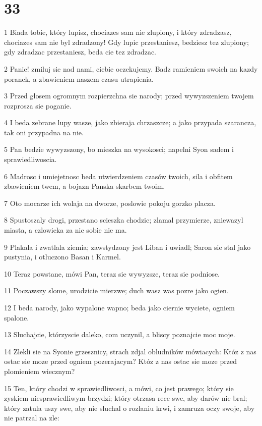 \chapter{33}

\par 1 Biada tobie, który lupisz, chociazes sam nie zlupiony, i który zdradzasz, chociazes sam nie byl zdradzony! Gdy lupic przestaniesz, bedziesz tez zlupiony; gdy zdradzac przestaniesz, beda cie tez zdradzac.
\par 2 Panie! zmiluj sie nad nami, ciebie oczekujemy. Badz ramieniem swoich na kazdy poranek, a zbawieniem naszem czasu utrapienia.
\par 3 Przed glosem ogromnym rozpierzchna sie narody; przed wywyzszeniem twojem rozprosza sie poganie.
\par 4 I beda zebrane lupy wasze, jako zbieraja chrzaszcze; a jako przypada szarancza, tak oni przypadna na nie.
\par 5 Pan bedzie wywyzszony, bo mieszka na wysokosci; napelni Syon sadem i sprawiedliwoscia.
\par 6 Madrosc i umiejetnosc beda utwierdzeniem czasów twoich, sila i obfitem zbawieniem twem, a bojazn Panska skarbem twoim.
\par 7 Oto mocarze ich wolaja na dworze, poslowie pokoju gorzko placza.
\par 8 Spustoszaly drogi, przestano scieszka chodzic; zlamal przymierze, zniewazyl miasta, a czlowieka za nic sobie nie ma.
\par 9 Plakala i zwatlala ziemia; zawstydzony jest Liban i uwiadl; Saron sie stal jako pustynia, i otluczono Basan i Karmel.
\par 10 Teraz powstane, mówi Pan, teraz sie wywyzsze, teraz sie podniose.
\par 11 Poczawszy slome, urodzicie mierzwe; duch wasz was pozre jako ogien.
\par 12 I beda narody, jako wypalone wapno; beda jako ciernie wyciete, ogniem spalone.
\par 13 Sluchajcie, którzyscie daleko, com uczynil, a bliscy poznajcie moc moje.
\par 14 Zlekli sie na Syonie grzesznicy, strach zdjal obludników mówiacych: Któz z nas ostac sie moze przed ogniem pozerajacym? Któz z nas ostac sie moze przed plomieniem wiecznym?
\par 15 Ten, który chodzi w sprawiedliwosci, a mówi, co jest prawego; który sie zyskiem niesprawiedliwym brzydzi; który otrzasa rece swe, aby darów nie bral; który zatula uszy swe, aby nie sluchal o rozlaniu krwi, i zamruza oczy swoje, aby nie patrzal na zle:
